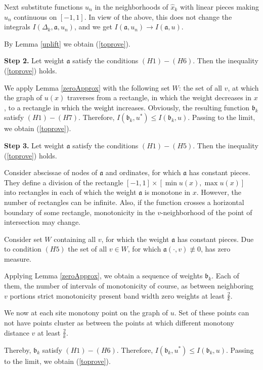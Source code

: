 Next substitute functions $u_n$ in the neighborhoods of $\hat{x}_k$ with linear pieces
making $u_n$ continuous on $[-1, 1]$.
In view of the above, this does not change the integrals $I(\Delta_k, \mathfrak a, u_n)$,
and we get $I(\mathfrak a, u_n) \to I(\mathfrak a, u)$.

By Lemma \ref{uplift} we obtain (\ref{toprove}).

\bigskip

{\bf Step 2.} Let weight $\mathfrak a$ satisfy the conditions $(H1)-(H6)$.
Then the inequality (\ref{toprove}) holds.

We apply Lemma \ref{zeroApprox} with the following set $W$:
the set of all $v$, at which the graph of $u(x)$ traverses from a rectangle,
in which the weight decreases in $x$,
to a rectangle in which the weight increases.
Obviously, the resulting function $\mathfrak b_k$ satisfy $(H1)-(H7)$.
Therefore, $I(\mathfrak b_k, u^*) \le I(\mathfrak b_k, u)$.
Passing to the limit, we obtain (\ref{toprove}).

\bigskip

{\bf Step 3.} Let weight $\mathfrak a$ satisfy the conditions $(H1)-(H5)$.
Then the inequality (\ref{toprove}) holds.

Consider abscissae of nodes of $\mathfrak a$
and ordinates, for which $\mathfrak a$ has constant pieces.
They define a division of the rectangle $[-1, 1] \times [\min u(x), \max u(x)]$
into rectangles in each of which the weight $\mathfrak a$ is monotone in $x$.
However, the number of rectangles can be infinite.
Also, if the function crosses a horizontal boundary of some rectangle,
monotonicity in the $v$-neighborhood of the point of intersection may change.

Consider set $W$ containing all $v$, for which the weight $\mathfrak a$ has constant pieces.
Due to condition $(H5)$ the set of all $v \in W$, for which $\mathfrak a(\cdot, v) \not\equiv 0$,
has zero measure.

Applying Lemma \ref{zeroApprox}, we obtain a sequence of weights $\mathfrak b_k$.
Each of them, the number of intervals of monotonicity of course,
as between neighboring $v$ portions strict monotonicity
present band width zero weights at least $\frac{2}{k}$.

We now at each site monotony point on the graph of $u$.
Set of these points can not have points cluster
as between the points at which different monotony
distance $v$ at least $\frac{2}{k}$.

Thereby, $\mathfrak b_k$ satisfy $(H1)-(H6)$. Therefore, $I(\mathfrak b_k, u^*) \le I(\mathfrak b_k, u)$.
Passing to the limit, we obtain (\ref{toprove}).

